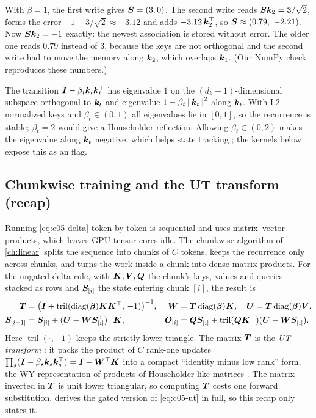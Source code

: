 \begin{example}
With $\beta = 1$, the first write gives $\bm{S} = (3, 0)$. The second write reads
$\bm{S}\bm{k}_2 = 3/\sqrt2$, forms the error $-1 - 3/\sqrt2 \approx -3.12$ and adds
$-3.12\,\bm{k}_2^{\top}$, so $\bm{S} \approx (0.79,\ -2.21)$. Now $\bm{S}\bm{k}_2 = -1$ exactly: the newest
association is stored without error. The older one reads $0.79$ instead of $3$, because the keys
are not orthogonal and the second write had to move the memory along $\bm{k}_2$, which overlaps
$\bm{k}_1$. (Our NumPy check reproduces these numbers.)
\end{example}

The transition $\bm{I} - \beta_t\bm{k}_t\bm{k}_t^{\top}$ has eigenvalue $1$ on the $(d_k-1)$-dimensional
subspace orthogonal to $\bm{k}_t$ and eigenvalue $1-\beta_t\left\lVert \bm{k}_t\right\rVert^2$ along $\bm{k}_t$. With
L2-normalized keys and $\beta_t \in (0,1)$ all eigenvalues lie in $[0,1]$, so the recurrence is
stable; $\beta_t = 2$ would give a Householder reflection. Allowing $\beta_t \in (0,2)$ makes the
eigenvalue along $\bm{k}_t$ negative, which helps state tracking \citep{c03-grazzi2025unlocking}; the
kernels below expose this as an  flag.

\subsection{Chunkwise training and the UT transform (recap)}\label{sec:c05-bg-chunk}

Running \cref{eq:c05-delta} token by token is sequential and uses matrix--vector products, which
leaves GPU tensor cores idle. The chunkwise algorithm of \cref{ch:linear}
\citep{c02-yang2024deltanet} splits the sequence into chunks of $C$ tokens, keeps the recurrence
only across chunks, and turns the work inside a chunk into dense matrix products. For the ungated
delta rule, with $\bm{K}, \bm{V}, \bm{Q}$ the chunk's keys, values and queries stacked as rows and
$\bm{S}_{[i]}$ the state entering chunk $[i]$, the result is
\begin{align}
  \bm{T} &= \big(\bm{I} + \operatorname{tril}(\operatorname{diag}(\bm{\beta})\bm{K}\bm{K}^{\top},\,-1)\big)^{-1}, &
  \bm{W} &= \bm{T}\operatorname{diag}(\bm{\beta})\bm{K}, \quad \bm{U} = \bm{T}\operatorname{diag}(\bm{\beta})\bm{V}, \label{eq:c05-ut}\\
  \bm{S}_{[i+1]} &= \bm{S}_{[i]} + (\bm{U} - \bm{W}\bm{S}_{[i]}^{\top})^{\top}\bm{K}, &
  \bm{O}_{[i]} &= \bm{Q}\bm{S}_{[i]}^{\top} + \operatorname{tril}(\bm{Q}\bm{K}^{\top})(\bm{U} - \bm{W}\bm{S}_{[i]}^{\top}). \nonumber
\end{align}
Here $\operatorname{tril}(\cdot,-1)$ keeps the strictly lower triangle. The matrix $\bm{T}$ is the
\emph{UT transform} \citep{c03-joffrain2006accumulating}: it packs the product of $C$ rank-one updates
$\prod_s(\bm{I} - \beta_s\bm{k}_s\bm{k}_s^{\top}) = \bm{I} - \bm{W}^{\top}\bm{K}$ into a compact ``identity minus low rank''
form, the WY representation of products of Householder-like matrices
\citep{c03-bischof1987wy}. The matrix inverted in $\bm{T}$ is unit lower triangular, so computing
$\bm{T}$ costs one forward substitution.  derives the gated version of \cref{eq:c05-ut} in full, so
this recap only states it.

